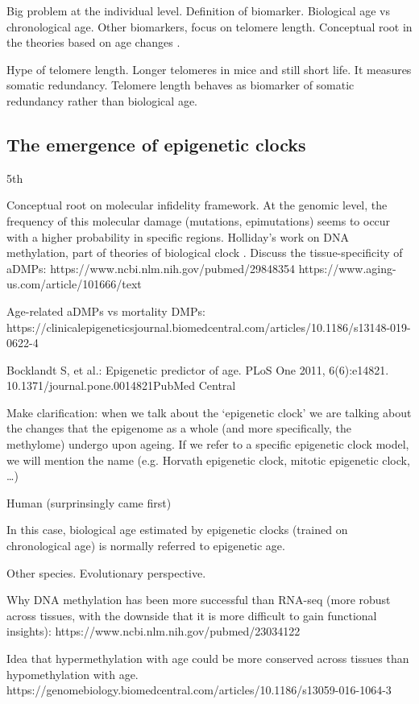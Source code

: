 Big problem at the individual level. Definition of biomarker. Biological age vs chronological age. Other biomarkers, focus on telomere length. 
Conceptual root in the theories based on age changes \cite{Medvedev1990}.

Hype of telomere length. Longer telomeres in mice and still short life.
It measures somatic redundancy. Telomere length behaves as biomarker of somatic redundancy rather than biological age.

\subsection{The emergence of epigenetic clocks}

5th

Conceptual root on molecular infidelity framework. At the genomic level, the frequency of this molecular damage (mutations, epimutations) seems to occur with a higher probability in specific regions. 
Holliday's work on DNA methylation, part of theories of biological clock \cite{Medvedev1990}. 
Discuss the tissue-specificity of aDMPs:
https://www.ncbi.nlm.nih.gov/pubmed/29848354
https://www.aging-us.com/article/101666/text

Age-related aDMPs vs mortality DMPs:
https://clinicalepigeneticsjournal.biomedcentral.com/articles/10.1186/s13148-019-0622-4

Bocklandt S, et al.: Epigenetic predictor of age. PLoS One 2011, 6(6):e14821. 10.1371/journal.pone.0014821PubMed Central

Make clarification: when we talk about the ‘epigenetic clock’ we are talking about the changes that the epigenome as a whole (and more specifically, the methylome) undergo upon ageing. If we refer to a specific epigenetic clock model, we will mention the name (e.g. Horvath epigenetic clock, mitotic epigenetic clock, …)

Human (surprinsingly came first)

In this case, biological age estimated by epigenetic clocks (trained on chronological age) is normally referred to epigenetic age. 

Other species. Evolutionary perspective.

Why DNA methylation has been more successful than RNA-seq (more robust across tissues, with the downside that it is more difficult to gain functional insights): https://www.ncbi.nlm.nih.gov/pubmed/23034122

Idea that hypermethylation with age could be more conserved across tissues than hypomethylation with age.
https://genomebiology.biomedcentral.com/articles/10.1186/s13059-016-1064-3

